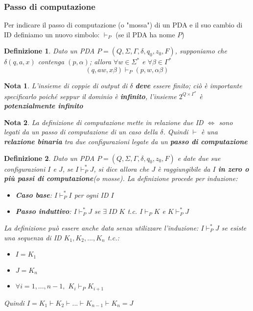 \documentclass[12pt]{article}
\newtheorem{Definizione}{Definizione}[subsection]
\newtheorem{Nota}{Nota}[subsection]
\begin{document}
\subsubsection{Passo di computazione}
Per indicare il passo di computazione (o "mossa") di un PDA e il suo cambio di ID definiamo un nuovo simbolo: $\vdash_P$ (se il PDA ha nome $P$)
\begin{Definizione}
    Dato un PDA $P = (Q, \Sigma, \Gamma, \delta, q_0, z_0, F)$, supponiamo che $\delta(q, a, x)$ contenga $(p, \alpha)$; allora $\forall w \in \Sigma^*$ e $\forall \beta \in \Gamma^*$
    $$(q, aw, x\beta) \vdash_P (p, w, \alpha\beta)$$
\end{Definizione}
\begin{Nota}
    L'insieme di coppie di output di $\delta$ \textbf{deve} essere finito; ciò è importante specificarlo poiché seppur il dominio è \textbf{infinito}, l'insieme $2^{Q \times \Gamma^*}$ è \textbf{potenzialmente infinito}
\end{Nota}
\begin{Nota}
    La definizione di computazione mette in relazione due ID $\Leftrightarrow$ sono legati da un passo di computazione di un caso della $\delta$. Quindi $\vdash$ è una \textbf{relazione binaria} tra due configurazioni legate da un \textbf{passo di computazione}
\end{Nota}
\begin{Definizione}
    Dato un PDA $P = (Q, \Sigma, \Gamma, \delta, q_0, z_0, F)$ e date due sue configurazioni $I$ e $J$, se $I \vdash^*_P J$, si dice allora che $J$ è raggiungibile da $I$ \textbf{in zero o più passi di computazione}(o mosse). La definizione procede per induzione:
    \begin{itemize}
        \item \textbf{Caso base}: $I \vdash^*_P I$ per ogni ID $I$
        \item \textbf{Passo induttivo}: $I \vdash^*_P J$ se $\exists \; ID \; K$ t.c. $I \vdash_P K$ e $K \vdash^*_P J$
    \end{itemize}
    La definizione può essere anche data senza utilizzare l'induzione: \newline
    $I \vdash^*_P J$ se esiste una sequenza di ID $K_1, K_2, ..., K_n$ t.c.:
    \begin{itemize}
        \item $I = K_1$
        \item $J = K_n$
        \item $\forall i = 1,...,n-1,$ $K_i \vdash_P K_{i+1}$
    \end{itemize}
    Quindi $I = K_1 \vdash K_2 \vdash ... \vdash K_{n-1} \vdash K_n = J$
\end{Definizione}
\end{document}
